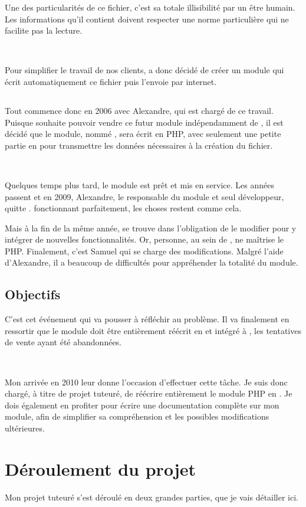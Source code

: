 Une des particularités de ce fichier, c'est sa totale illisibilité par un être humain. Les informations qu'il contient doivent respecter une norme particulière qui ne facilite pas la lecture.

~

Pour simplifier le travail de nos clients, \solulog{} a donc décidé de créer un module qui écrit automatiquement ce fichier puis l'envoie par internet.

\subsection{\pireus}
Tout commence donc en 2006 avec Alexandre, qui est chargé de ce travail. Puisque \solulog{} souhaite pouvoir vendre ce futur module indépendamment de \integrale, il est décidé que le module, nommé \emph{\pireus}, sera écrit en PHP, avec seulement une petite partie en \vb{} pour transmettre les données nécessaires à la création du fichier.

~

Quelques temps plus tard, le module est prêt et mis en service. Les années passent et en 2009, Alexandre, le responsable du module et seul développeur, quitte \solulog. \pireus{} fonctionnant parfaitement, les choses restent comme cela.

Mais à la fin de la même année, \solulog{} se trouve dans l'obligation de le modifier pour y intégrer de nouvelles fonctionnalités. Or, personne, au sein de \solulog, ne maîtrise le PHP. Finalement, c'est Samuel qui se charge des modifications. Malgré l'aide d'Alexandre, il a beaucoup de difficultés pour appréhender la totalité du module.

\subsection{Objectifs}
C'est cet événement qui va pousser \solulog{} à réfléchir au problème. Il va finalement en ressortir que le module doit être entièrement réécrit en \vb{} et intégré à \integrale, les tentatives de vente ayant été abandonnées.

~

Mon arrivée en 2010 leur donne l'occasion d'effectuer cette tâche. Je suis donc chargé, à titre de projet tuteuré, de réécrire entièrement le module PHP en \vb. Je dois également en profiter pour écrire une documentation complète sur mon module, afin de simplifier sa compréhension et les possibles modifications ultérieures.

\section{Déroulement du projet}
Mon projet tuteuré s'est déroulé en deux grandes parties, que je vais détailler ici.


